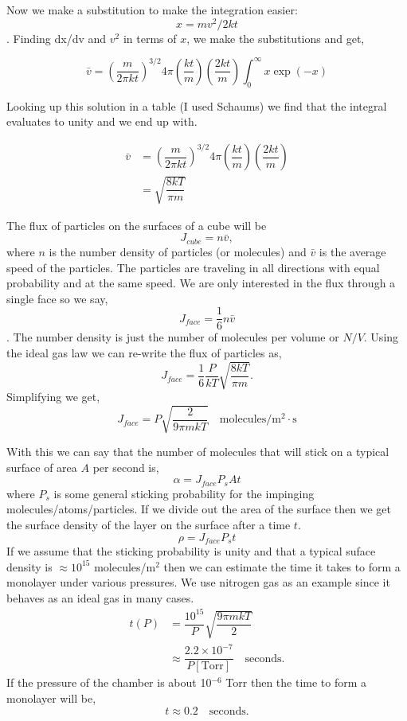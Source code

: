 \documentclass[12pt]{article}
\renewcommand{\=}[1]{\stackrel{#1}{=}} %
\theoremstyle{definition}
\theoremstyle{remark}
\begin{document}
Now we make a substitution to make the integration easier: $$x = mv^2/2kt$$. Finding dx/dv and $v^2$ in terms of $x$,  we make the substitutions and get,

\[
	\bar{v} = \left(\dfrac{m}{2\pi kt}\right)^{3/2} 4\pi\left(\dfrac{kt}{m}\right) \left(\dfrac{2kt}{m}\right) \int_{0}^{\infty} x \exp{\left(-x\right)}
\]

Looking up this solution in a table (I used Schaums) we find that the integral evaluates to unity and we end up with.

\begin{align*}
	\bar{v} &=  \left(\dfrac{m}{2\pi kt}\right)^{3/2} 4\pi\left(\dfrac{kt}{m}\right) \left(\dfrac{2kt}{m}\right)\\[3mm]
		&= \sqrt{\dfrac{8kT}{\pi m}}
\end{align*}
	
The flux of particles on the surfaces of a cube will be
\[
 J_{cube} = n\bar{v},
\]
where $n$ is the number density of particles (or molecules) and $\bar{v}$ is the average speed of the particles. The particles are traveling in all directions with equal probability and at the same speed. We are only interested in the flux through a single face so we say,
\[J_{face} = \dfrac{1}{6}n\bar{v}\].
The number density is just the number of molecules per volume or $N/V$. Using the ideal gas law we can re-write the flux of particles as,
\[
	J_{face} = \dfrac{1}{6}\dfrac{P}{kT} \sqrt{\dfrac{8kT}{\pi m}}.
\]
Simplifying we get,
\[
	J_{face} = P\sqrt{\dfrac{2}{9\pi mkT}}\quad \text{molecules}/\text{m}^2\cdot \text{s}
\]

With this we can say that the number of molecules that will stick on a typical surface of area $A$ per second is,
\[
	\alpha = J_{face}P_s At
\]
where $P_s$ is some general sticking probability for the impinging molecules/atoms/particles. If we divide out the area of the surface then we get the surface density of the layer on the surface after a time $t$.
\[
	\rho = J_{face}P_s t
\]
If we assume that the sticking probability is unity and that a typical suface density is $\approx 10^{15}$ molecules/m$^2$ then we can estimate the time it takes to form a monolayer under various pressures. We use nitrogen gas as an example since it behaves as an ideal gas in many cases.
\begin{align*}
	t(P) &= \dfrac{10^{15}}{P}\sqrt{\dfrac{9\pi mkT}{2}}\\[3mm]
		&\approx \dfrac{2.2\times10^{-7}}{P[\text{Torr}]}\quad \text{seconds}.
\end{align*}
If the pressure of the chamber is about 10$^{-6}$ Torr then the time to form a monolayer will be,
\[
	t \approx 0.2 \quad \text{seconds}.
\]
\end{document}
